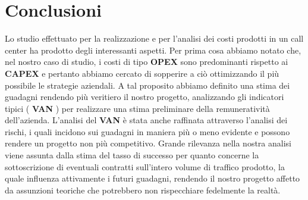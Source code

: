\chapter[Conclusioni]{Conclusioni}

Lo studio effettuato per la realizzazione e per l'analisi dei costi prodotti in un call center ha prodotto degli interessanti aspetti.
\newline
Per prima cosa abbiamo notato che, nel nostro caso di studio, i costi di tipo \textbf{\ac{OPEX}} sono predominanti rispetto ai \textbf{\ac{CAPEX}} e pertanto abbiamo cercato di sopperire a ciò ottimizzando il più possibile le strategie aziendali. A tal proposito abbiamo definito una stima dei guadagni rendendo più veritiero il nostro progetto, analizzando gli indicatori tipici ( \textbf{\ac{VAN}} ) per realizzare una stima preliminare della remuneratività dell'azienda.
\newline
L'analisi del \textbf{\ac{VAN}} è stata anche raffinata attraverso l'analisi dei rischi, i quali incidono sui guadagni in maniera più o meno evidente e possono rendere un progetto non più competitivo.
\newline
Grande rilevanza nella nostra analisi viene assunta dalla stima del tasso di successo per quanto concerne la sottoscrizione di eventuali contratti sull'intero volume di traffico prodotto, la quale influenza attivamente i futuri guadagni, rendendo il nostro progetto affetto da assunzioni teoriche che potrebbero non rispecchiare fedelmente la realtà. 